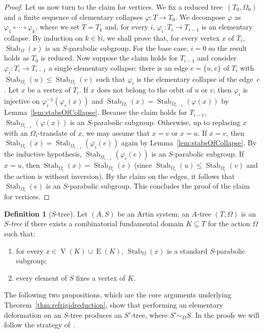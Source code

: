 \documentclass[svgnames]{amsart}
\theoremstyle{plain}
\theoremstyle{definition}
\newtheorem{defn}[thm]{Definition}
\newcommand{\edge}[1]{\operatorname{E}(#1)}
\newcommand{\Stab}[2]{\operatorname{Stab}_{#1}\left(#2\right)}
\renewcommand{\phi}{\varphi}
\newcommand{\ver}[1]{\operatorname{V}(#1)}
\begin{document}
\begin{proof}
    Let us now turn to the claim for vertices. We fix a reduced tree~$(T_0,\Omega_0)$ and a finite sequence of elementary collapses $\phi\colon T\to T_0$. We decompose $\phi$ as $\phi_1\circ\cdots\circ\phi_k$, where we set $T=T_k$ and, for every $i$, $\phi_i\colon T_i\to T_{i-1}$ is an elementary collapse. By induction on $k\in\mathbb N$, we shall prove that, for every vertex $x$ of $T_i$, $\Stab \Omega x$ is an $S$-parabolic subgroup. For the base case, $i=0$ so the result holds as $T_0$ is reduced. Now suppose the claim holds for $T_{i-1}$ and consider $\phi_i\colon T_i \to T_{i-1}$ a single elementary collapse: there is an edge $e=\{u,v\}$ of $T_i$ with $\Stab{\Omega_i} {u}\le\Stab{\Omega_i}{v}$ such that $\phi_i$ is the elementary collapse of the edge~$e$. Let $x$ be a vertex of $T_i$. If $x$ does not belong to the orbit of $u$ or $v$, then $\phi_i$ is injective on $\phi_i^{-1}(\phi_i(x))$ and $\Stab{\Omega_i}{x}=\Stab{\Omega_{i-1}}{\phi(x)}$ by Lemma~\ref{lem:stabsOfCollapse}. Because the claim holds for $T_{i-1}$, $\Stab{\Omega_{i-1}}{\phi(x)}$ is an $S$-parabolic subgroup. Otherwise, up to replacing $x$ with an $\Omega_i$-translate of $x$, we may assume that $x=v$ or $x=u$. If $x=v$, then $\Stab{\Omega_i} {x}=\Stab{\Omega_{i-1}}{\phi_i(e)}$ again by Lemma~\ref{lem:stabsOfCollapse}. By the inductive hypothesis, $\Stab{\Omega_{i-1}}{\phi_i(e)}$ is an $S$-parabolic subgroup. If $x=u$, then $\Stab{\Omega_i} {x}=\Stab{\Omega_i} {e}$ (since $\Stab{\Omega_i} {u}\le\Stab{\Omega_i}{v}$ and the action is without inversion). By the claim on the edges, it follows that $\Stab{\Omega_i}{e}$ is an $S$-parabolic subgroup. This concludes the proof of the claim for vertices.
\end{proof}
    

\begin{defn}[$S$-tree]
    \label{def:Gamma-tree}
    Let $(A,S)$ be an Artin system; an $A$-tree $(T,\Omega)$ is an \emph{$S$-tree} if there exists a combinatorial fundamental domain $K\subseteq T$ for the action $\Omega$ such that:
    \begin{enumerate}
        \item for every $x\in\ver K\cup\edge K$, $\Stab{\Omega}{x}$ is a standard $S$-parabolic subgroup;
        \item every element of $S$ fixes a vertex of $K$.
    \end{enumerate} 
\end{defn}

\noindent The following two propositions, which are the core arguments underlying Theorem~\ref{thm:refrigidreduction}, show that performing an elementary deformation on an $S$-tree produces an $S'$-tree, where $S'\sim_D S$.
In the proofs we will follow the strategy of~\cite[Lemma 4.8 and Lemma 4.9]{Jones_VF}. 
\end{document}
